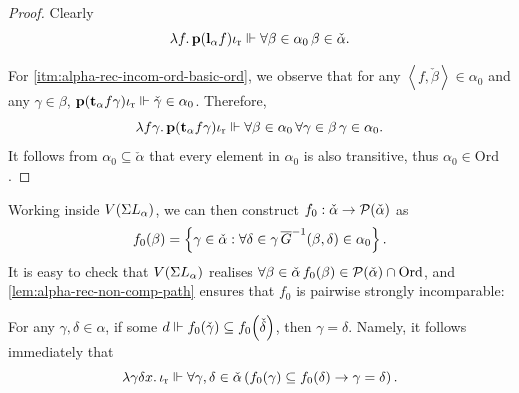 \documentclass[12pt,openany]{book}
\theoremstyle{plain}
\theoremstyle{definition}
\newcommand\tuple[1]{\left\langle #1 \right\rangle}
\newcommand\opA[1]{\mathop{\forall #1}}
\newcommand\oplam[1]{\mathop{\lambda #1.}}
\newcommand\Pow{\mathcal{P}}
\newcommand\Ord{\mathrm{Ord}}
\newcommand\bp{\mathbf{p}}
\newcommand\bl{\mathbf{l}}
\newcommand\bt{\mathbf{t}}
\newcommand\ior{\iota_\textup{r}}
\begin{document}
\begin{proof}
  Clearly
  \[\oplam{f} \bp \mleft(\bl_\alpha f\mright) \ior \Vdash \opA{\beta \in \alpha_0} \beta \in \check{\alpha}.\]

  For \ref{itm:alpha-rec-incom-ord-basic-ord}, we observe that for any $\tuple{f, \check{\beta}} \in \alpha_0$ and any $\gamma \in \beta$, $\bp \mleft(\bt_\alpha f \gamma\mright) \ior \Vdash \check{\gamma} \in \alpha_0$. Therefore,
  \[\oplam{f \gamma} \bp \mleft(\bt_\alpha f \gamma\mright) \ior \Vdash \opA{\beta \in \alpha_0} \opA{\gamma \in \beta} \gamma \in \alpha_0.\]
  It follows from $\alpha_0 \subseteq \check{\alpha}$ that every element in $\alpha_0$ is also transitive, thus $\alpha_0 \in \Ord$.
\end{proof}

Working inside $V\mleft(\Sigma L_\alpha\mright)$, we can then construct $f_0 : \check{\alpha} \rightarrow \Pow\mleft(\check{\alpha}\mright)$ as
\[f_0\mleft(\beta\mright) = \left\{\gamma \in \check{\alpha} : \opA{\delta \in \gamma} \overline{G}^{-1}\mleft(\beta, \delta\mright) \in \alpha_0\right\}.\]
It is easy to check that $V\mleft(\Sigma L_\alpha\mright)$ realises $\opA{\beta \in \check{\alpha}} f_0\mleft(\beta\mright) \in \Pow\mleft(\check{\alpha}\mright) \cap \Ord$, and \autoref{lem:alpha-rec-non-comp-path} ensures that $f_0$ is pairwise strongly incomparable:
\begin{proposition}
  For any $\gamma, \delta \in \alpha$, if some $d \Vdash f_0\mleft(\check{\gamma}\mright) \subseteq f_0\mleft(\check{\delta}\mright)$, then $\gamma = \delta$. Namely, it follows immediately that
  \[\oplam{\gamma \delta x} \ior \Vdash \opA{\gamma, \delta \in \check{\alpha}} \left(f_0\mleft(\gamma\mright) \subseteq f_0\mleft(\delta\mright) \rightarrow \gamma = \delta\right).\]
\end{proposition}
\end{document}
